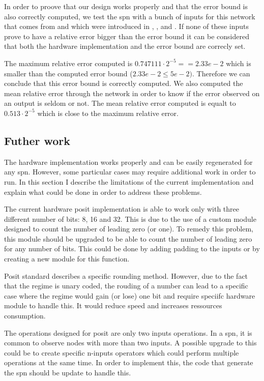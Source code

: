 In order to proove that our design works properly and that the error bound is also correctly computed, we test the \gls{spn} with a bunch of inputs for this network that comes from \cite{dataset} and which were introduced in \cite{dataset_1}, \cite{dataset_2}, \cite{dataset_3} and \cite{dataset_4}. If none of these inputs prove to have a relative error bigger than the error bound it can be considered that both the hardware implementation and the error bound are correcly set.

The maximum relative error computed is $0.747111 \cdot 2^{-5} == 2.33e-2$ which is smaller than the computed error bound ($2.33e-2 \leq 5e-2)$. Therefore we can conclude that this error bound is correctly computed. We also computed the mean relative error through the network in order to know if the error observed on an output is seldom or not. The mean relative error computed is equalt to $0.513 \cdot 2^{-5}$ which is close to the maximum relative error.

\subsection{Futher work}

The hardware implementation works properly and can be easily regenerated for any \gls{spn}. However, some particular cases may require additional work in order to run. In this section I describe the limitations of the current implementation and explain what could be done in order to address these problems.

The current hardware posit implementation is able to work only with three different number of bits: 8, 16 and 32. This is due to the use of a custom module designed to count the number of leading zero (or one). To remedy this problem, this module should be upgraded to be able to count the number of leading zero for any number of bits. This could be done by adding padding to the inputs or by creating a new module for this function.

Posit standard describes a specific rounding method. However, due to the fact that the regime is unary coded, the rouding of a number can lead to a specific case where the regime would gain (or lose) one bit and require speciifc hardware module to handle this. It would reduce speed and increases ressources consumption.

The operations designed for posit are only two inputs operations. In a \gls{spn}, it is common to observe nodes with more than two inputs. A possible upgrade to this could be to create specific n-inputs operators which could perform multiple operations at the same time. In order to implement this, the code that generate the \gls{spn} should be update to handle this.

